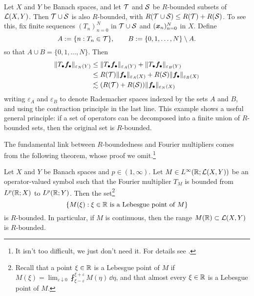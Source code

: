 \begin{example}\label{eg:R-bounded-unions}
  Let $X$ and $Y$ be Banach spaces, and let $\mathcal{T}$ and $\mathcal{S}$ be $R$-bounded subsets of $\mathcal{L}(X,Y)$.
  Then $\mathcal{T} \cup \mathcal{S}$ is also $R$-bounded, with $R(\mathcal{T} \cup \mathcal{S}) \leq R(\mathcal{T}) + R(\mathcal{S})$.
  To see this, fix finite sequences $(T_{n})_{n=0}^{N}$ in $\mathcal{T} \cup \mathcal{S}$ and $(\bm{x}_{n})_{n=0}^{N}$ in $X$.
  Define
  \begin{equation*}
    A := \{n : T_{n} \in \mathcal{T}\}, \qquad B := \{0,1,\ldots,N\} \setminus A.
  \end{equation*}
  so that $A \cup B = \{0,1,\ldots,N\}$.
  Then
  \begin{equation*}
    \begin{aligned}
      \|T_{\bullet} \bm{f}_{\bullet}\|_{\varepsilon_{N}(Y)}
      &\leq \|T_{\bullet} \bm{f}_{\bullet}\|_{\varepsilon_{A}(Y)} + \|T_{\bullet} \bm{f}_{\bullet}\|_{\varepsilon_{B}(Y)} \\
      &\leq R(\mathcal{T}) \| \bm{f}_{\bullet}\|_{\varepsilon_{A}(X)} + R(\mathcal{S}) \| \bm{f}_{\bullet}\|_{\varepsilon_{B}(X)} \\
      &\lesssim (R(\mathcal{T}) + R(\mathcal{S})) \|\bm{f}_{\bullet}\|_{\varepsilon_{N}(X)}
    \end{aligned}
  \end{equation*}
  writing $\varepsilon_{A}$ and $\varepsilon_{B}$ to denote Rademacher spaces indexed by the sets $A$ and $B$, and using the contraction principle in the last line.
  This example shows a useful general principle: if a set of operators can be decomposed into a finite union of $R$-bounded sets, then the original set is $R$-bounded.
\end{example}

The fundamental link between $R$-boundedness and Fourier multipliers comes from the following theorem, whose proof we omit.\footnote{It isn't too difficult, we just don't need it. For details see \cite[Theorem 5.3.15]{HNVW16}.}

\begin{thm}
  Let $X$ and $Y$ be Banach spaces and $p \in (1,\infty)$.
  Let $M \in L^\infty(\mathbb{R};\mathcal{L}(X,Y))$ be an operator-valued symbol such that the Fourier multiplier $T_{M}$ is bounded from $L^p(\mathbb{R};X)$ to $L^p(\mathbb{R};Y)$.
  Then the set\footnote{Recall that a point $\xi \in \mathbb{R}$ is a Lebesgue point of $M$ if $M(\xi) = \lim_{\varepsilon \downarrow 0} \fint_{\xi-\varepsilon}^{\xi+\varepsilon} M(\eta) \, \dd\eta $, and that almost every $\xi \in \mathbb{R}$ is a Lebesgue point of $M$.}
  \begin{equation*}
    \{M(\xi) : \text{$\xi \in \mathbb{R}$ is a Lebesgue point of $M$}\}
  \end{equation*}
  is $R$-bounded.
  In particular, if $M$ is continuous, then the range $M(\mathbb{R}) \subset \mathcal{L}(X,Y)$ is $R$-bounded.
\end{thm}

